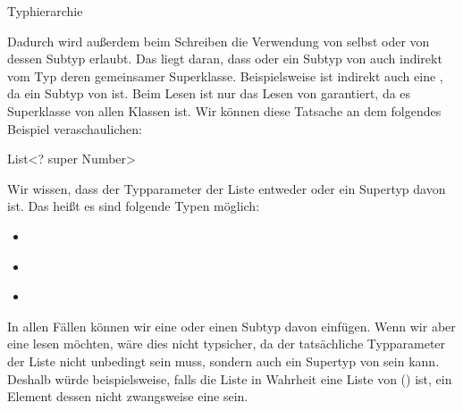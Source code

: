\documentclass{../tuda-exercise}
\begin{document}
\begin{task}[credit=\stars{2}{3}]{Typhierarchie}
\begin{solution}
\begin{note}[title=Information:]
\begin{itemize}
          Dadurch wird außerdem beim Schreiben die Verwendung von  selbst oder von
          dessen Subtyp erlaubt. Das liegt daran, dass  oder ein Subtyp von
           auch indirekt vom Typ deren gemeinsamer Superklasse. Beispielsweise ist
          \href{https://docs.oracle.com/en/java/javase/11/docs/api/java.base/java/lang/Integer.html}
          {} indirekt auch eine
          \href{https://docs.oracle.com/en/java/javase/11/docs/api/java.base/java/lang/Number.html}
          {}, da
          \href{https://docs.oracle.com/en/java/javase/11/docs/api/java.base/java/lang/Integer.html}
          {} ein Subtyp von
          \href{https://docs.oracle.com/en/java/javase/11/docs/api/java.base/java/lang/Number.html}
          {} ist. Beim Lesen ist nur das Lesen von 
          garantiert, da es Superklasse von allen Klassen ist. Wir können diese Tatsache an dem
          folgendes Beispiel veraschaulichen:

          \begin{center}
            List<? super Number>
          \end{center}

          Wir wissen, dass der Typparameter der Liste entweder  oder ein
          Supertyp davon ist. Das heißt es sind folgende Typen möglich:

          \begin{itemize}
            \item \href{https://docs.oracle.com/en/java/javase/11/docs/api/java.base/java/lang/Number.html}
            {}
            \item \href{https://docs.oracle.com/en/java/javase/11/docs/api/java.base/java/io/Serializable.html}
            {}
            \item \href{https://docs.oracle.com/en/java/javase/11/docs/api/java.base/java/lang/Object.html}
            {}
          \end{itemize}

          In allen Fällen können wir eine  oder einen Subtyp davon einfügen.
          Wenn wir aber eine  lesen möchten, wäre dies nicht typsicher, da der
          tatsächliche Typparameter der Liste nicht unbedingt  sein muss,
          sondern auch ein Supertyp von  sein kann. Deshalb würde
          beispielsweise, falls die Liste in Wahrheit eine Liste von 
          () ist, ein Element dessen nicht zwangsweise eine
           sein.
        \end{itemize}
      \end{note}
    \end{solution}
  \end{task}
\end{document}
